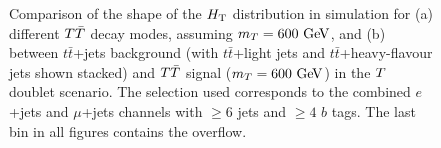 \begin{figure}[h!tb]\begin{center}
	\caption{Comparison of the shape of the $\HT$ distribution in simulation for (a) different $\TT$ decay modes, assuming $m_{\T}=600\gev$,
and (b) between $t\bar{t}$+jets background (with $t\bar{t}$+light jets and $t\bar{t}$+heavy-flavour jets shown stacked) 
and $\TT$ signal ($m_{\T}=600\gev$) in the $\T$ doublet scenario.
The selection used corresponds to the combined $e$+jets and $\mu$+jets channels with $\geq 6$ jets and $\geq 4$ $b$ tags. 
The last bin in all figures contains the overflow.}
\end{center}\end{figure}
